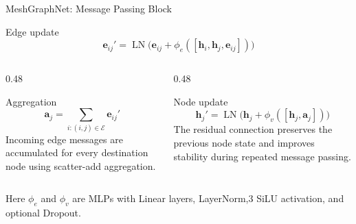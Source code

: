 \documentclass[aspectratio=169,10pt]{beamer}
\begin{document}
\begin{frame}{MeshGraphNet: Message Passing Block}
  \setlength{\abovedisplayskip}{2pt}
  \setlength{\belowdisplayskip}{2pt}

  \begin{block}{Edge update}
    \[
      \mathbf{e}_{ij}' =
      \operatorname{LN}\Big(
      \mathbf{e}_{ij}+
      \phi_e([\mathbf{h}_i,\mathbf{h}_j,\mathbf{e}_{ij}])
      \Big)
    \]
  \end{block}

  \begin{columns}[T]
    \begin{column}{0.48\textwidth}
      \begin{block}{Aggregation}
        \scriptsize
        \[
          \mathbf{a}_j =
          \sum_{i:(i,j)\in\mathcal{E}}
          \mathbf{e}_{ij}'
        \]
        Incoming edge messages are accumulated for every destination node
        using scatter-add aggregation.
      \end{block}
    \end{column}

    \begin{column}{0.48\textwidth}
      \begin{block}{Node update}
        \scriptsize
        \[
          \mathbf{h}_j' =
          \operatorname{LN}\Big(
          \mathbf{h}_j+
          \phi_v([\mathbf{h}_j,\mathbf{a}_j])
          \Big)
        \]
        The residual connection preserves the previous node state and improves
        stability during repeated message passing.
      \end{block}
    \end{column}
  \end{columns}

  \vskip 4pt
  \scriptsize
  Here \(\phi_e\) and \(\phi_v\) are MLPs with Linear layers, LayerNorm,3
  SiLU activation, and optional Dropout.
\end{frame}
\end{document}
